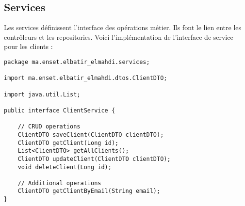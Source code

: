 \subsection{Services}
Les services définissent l'interface des opérations métier. Ils font le lien entre les contrôleurs et les repositories. Voici l'implémentation de l'interface de service pour les clients :

\begin{lstlisting}[caption=Interface Service pour Client]
package ma.enset.elbatir_elmahdi.services;

import ma.enset.elbatir_elmahdi.dtos.ClientDTO;

import java.util.List;

public interface ClientService {
    
    // CRUD operations
    ClientDTO saveClient(ClientDTO clientDTO);
    ClientDTO getClient(Long id);
    List<ClientDTO> getAllClients();
    ClientDTO updateClient(ClientDTO clientDTO);
    void deleteClient(Long id);
    
    // Additional operations
    ClientDTO getClientByEmail(String email);
}
\end{lstlisting}

